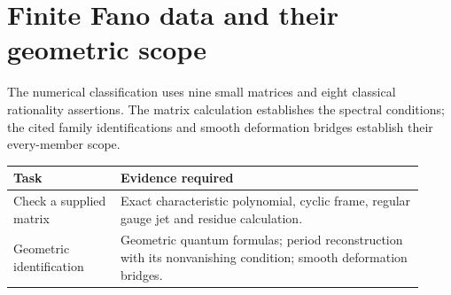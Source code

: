 \section{Finite Fano data and their geometric scope}
\label{sec:fano-data}
The numerical classification uses nine small matrices and eight classical
rationality assertions. The matrix calculation establishes the spectral
conditions; the cited family identifications and smooth deformation bridges
establish their every-member scope.

\begin{center}\small
\begin{tabular}{@{}p{0.24\linewidth}p{0.68\linewidth}@{}}
\toprule
Task & Evidence required\\\midrule
Check a supplied matrix & Exact characteristic polynomial, cyclic frame,
regular gauge jet and residue calculation.\\
\raggedright Geometric identification & Geometric quantum formulas; period
reconstruction with its nonvanishing condition; smooth deformation bridges.\\
\bottomrule
\end{tabular}
\end{center}
